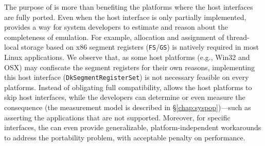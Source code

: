 


The purpose of \graphene{} is more than benefiting the platforms where the host interfaces are fully ported.
Even when the host interface is only partially implemented,
\graphene{} provides a way for system developers to estimate and reason about the completeness of emulation.
For example, allocation and assignment of thread-local storage based on x86 segment registers ({\tt FS}/{\tt GS})
is natively required in most Linux applications.
We observe that, as some host platforms (e.g., Win32 and OSX) may confiscate the segment registers for their own reasons,
implementing this host interface ({\tt DkSegmentRegisterSet}) is not necessary feasible on every platforms.
Instead of obligating full compatibility,
\graphene{} allows the host platforms to skip host interfaces,
while the developers can determine or even measure the consequence (the measurement model is described in \S\ref{chap:syspop})---such as asserting the applications that are not supported.
Moreover, for specific interfaces,
the \libos{} can even provide generalizable, platform-independent workarounds to address the portability problem,
with acceptable penalty on performance.



